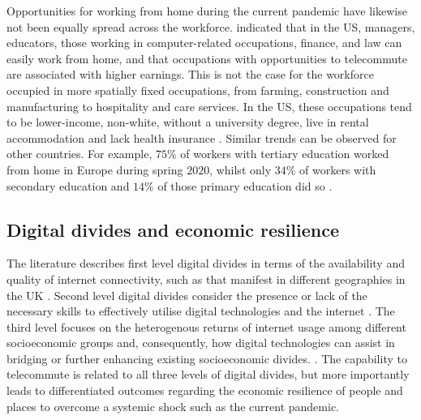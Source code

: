 \documentclass[]{interact}
\theoremstyle{plain}%
\theoremstyle{definition}
\theoremstyle{remark}
\begin{document}
Opportunities for working from home during the current pandemic have
likewise not been equally spread across the workforce.
\citet{NBERw26948} indicated that in the US, managers, educators, those
working in computer-related occupations, finance, and law can easily
work from home, and that occupations with opportunities to telecommute
are associated with higher earnings. This is not the case for the
workforce occupied in more spatially fixed occupations, from farming,
construction and manufacturing to hospitality and care services. In the
US, these occupations tend to be lower-income, non-white, without a
university degree, live in rental accommodation and lack health
insurance \citep{NBERw27085}. Similar trends can be observed for other
countries. For example, \(75\)\% of workers with tertiary education
worked from home in Europe during spring \(2020\), whilst only \(34\)\%
of workers with secondary education and \(14\)\% of those primary
education did so \citep{eurofound2020}.

\hypertarget{sec:2.2}{%
\subsection{Digital divides and economic resilience}\label{sec:2.2}}

The literature describes first level digital divides in terms of the
availability and quality of internet connectivity, such as that manifest
in different geographies in the UK
\citep{riddlesden2014broadband, philip2017digital}. Second level digital
divides consider the presence or lack of the necessary skills to
effectively utilise digital technologies and the internet
\citep{blank2014dimensions, van2011internet}. The third level focuses on
the heterogenous returns of internet usage among different socioeconomic
groups and, consequently, how digital technologies can assist in
bridging or further enhancing existing socioeconomic divides.
\citep{stern2009levels, van2014digital, van2015third}. The capability to
telecommute is related to all three levels of digital divides, but more
importantly leads to differentiated outcomes regarding the economic
resilience of people and places to overcome a systemic shock such as the
current pandemic.
\end{document}
